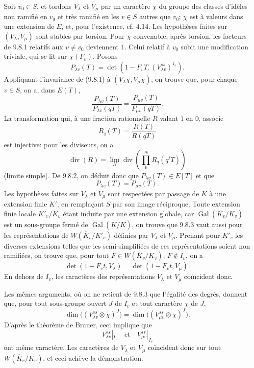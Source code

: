 \documentclass[10pt]{article}
\newcommand{\Gal}{\operatorname{Gal}}
\providecommand{\Gal}{\operatorname{Gal}}
\providecommand{\Gal}{\operatorname{Gal}}
\providecommand{\Gal}{\operatorname{Gal}}
\providecommand{\Gal}{\operatorname{Gal}}
\begin{document}
Soit $v_0\in S$, et tordons $V_\lambda$ et $V_\mu$ par un caractère $\chi$ du groupe des classes d'idèles non ramifié en $v_0$ et très ramifié en les $v\in S$ autres que $v_0$; $\chi$ est à valeurs dans une extension de $E$, et, pour l'existence, cf. 4.14. Les hypothèses faites sur $(V_\lambda,V_\mu)$ sont stables par torsion. Pour $\chi$ convenable, après torsion, les facteurs de 9.8.1 relatifs aux $v\ne v_0$ deviennent $1$. Celui relatif à $v_0$ subit une modification triviale, qui se lit sur $\chi(F_v)$. Posons
\[
P_{\lambda v}(T)=\det(1-F_vT,(V_{\lambda v}^{ss})^{I_v}).
\]
Appliquant l'invariance de (9.8.1) à $(V_\lambda\chi,V_\mu\chi)$, on trouve que, pour chaque $v\in S$, on a, dans $E(T)$,
\[
\tag{9.8.2}
\frac{P_{\lambda v}(T)}{P_{\lambda v}(qT)}=
\frac{P_{\mu v}(T)}{P_{\mu v}(qT)}.
\]
La transformation qui, à une fraction rationnelle $R$ valant $1$ en $0$, associe
\[
R_q(T)=\frac{R(T)}{R(qT)}
\]
est injective: pour les diviseurs, on a
\[
\operatorname{div}(R)=\lim_N \operatorname{div}\left(\prod_{0}^{N}R_q(q^iT)\right)
\]
(limite simple). De 9.8.2, on déduit donc que $P_{\lambda v}(T)\in E[T]$ et que
\[
\tag{9.8.3}
P_{\lambda v}(T)=P_{\mu v}(T).
\]
Les hypothèses faites sur $V_\lambda$ et $V_\mu$ sont respectées par passage de $K$ à une extension finie $K'$, en remplaçant $S$ par son image réciproque. Toute extension finie locale $K'_v/K_v$ étant induite par une extension globale, car $\Gal(\overline K_v/K_v)$ est un sous-groupe fermé de $\Gal(\overline K/K)$, on trouve que 9.8.3 vaut aussi pour les représentations de $W(\overline K_v/K'_v)$ définies par $V_\lambda$ et $V_\mu$. Prenant pour $K'_v$ les diverses extensions telles que les semi-simplifiées de ces représentations soient non ramifiées, on trouve que, pour tout $F\in W(\overline K_v/K_v)$, $F\notin I_v$, on a
\[
\det(1-F_vt,V_\lambda)=\det(1-F_vt,V_\mu).
\]
En dehors de $I_v$, les caractères des représentations $V_\lambda$ et $V_\mu$ coïncident donc.

Les mêmes arguments, où on ne retient de 9.8.3 que l'égalité des degrés, donnent que, pour tout sous-groupe ouvert $J$ de $I_v$ et tout caractère $\chi$ de $J$,
\[
\dim\bigl((V_{\lambda v}^{ss}\otimes\chi)^J\bigr)
=
\dim\bigl((V_{\mu v}^{ss}\otimes\chi)^J\bigr).
\]
D'après le théorème de Brauer, ceci implique que
\[
V_{\lambda v}^{ss}|_{I_v}\quad\text{et}\quad V_{\mu v}^{ss}|_{I_v}
\]
ont même caractère. Les caractères de $V_\lambda$ et $V_\mu$ coïncident donc sur tout $W(\overline K_v/K_v)$, et ceci achève la démonstration.
\end{document}
